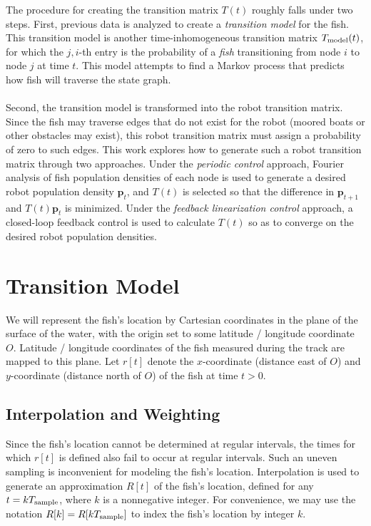 \documentclass[11pt,letterpaper]{article}
\begin{document}
	The procedure for creating the transition matrix $T(t)$ roughly falls under two steps. First, previous data is analyzed to create a \textit{transition model} for the fish. This transition model is another time-inhomogeneous transition matrix $T_{\rm model}(t)$, for which the $j, i$-th entry is the probability of a \textit{fish} transitioning from node $i$ to node $j$ at time $t$. This model attempts to find a Markov process that predicts how fish will traverse the state graph.
	\\\\
	Second, the transition model is transformed into the robot transition matrix. Since the fish may traverse edges that do not exist for the robot (moored boats or other obstacles may exist), this robot transition matrix must assign a probability of zero to such edges. This work explores how to generate such a robot transition matrix through two approaches. Under the \textit{periodic control} approach, Fourier analysis of fish population densities of each node is used to generate a desired robot population density $\mathbf p_t$, and $T(t)$ is selected so that the difference in $\mathbf p_{t + 1}$ and $T(t) \mathbf p_t$ is minimized. Under the \textit{feedback linearization control} approach, a closed-loop feedback control is used to calculate $T(t)$ so as to converge on the desired robot population densities.
	
	\section{Transition Model}
	
	We will represent the fish's location by Cartesian coordinates in the plane of the surface of the water, with the origin set to some latitude / longitude coordinate $O$. Latitude / longitude coordinates of the fish measured during the track are mapped to this plane. Let $r[t]$ denote the $x$-coordinate (distance east of $O$) and $y$-coordinate (distance north of $O$) of the fish at time $t > 0$.
	
	\subsection{Interpolation and Weighting}
	
	Since the fish's location cannot be determined at regular intervals, the times for which $r[t]$ is defined also fail to occur at regular intervals. Such an uneven sampling is inconvenient for modeling the fish's location. Interpolation is used to generate an approximation $R[t]$ of the fish's location, defined for any $t = kT_{\rm sample}$, where $k$ is a nonnegative integer. For convenience, we may use the notation $R[k] = R[k T_{\rm sample}]$ to index the fish's location by integer $k$.
	
\end{document}

